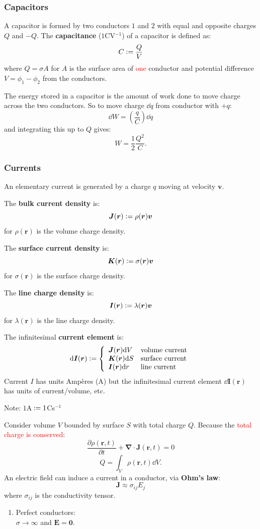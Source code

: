 \documentclass{article}
\newcommand{\deq}{\vcentcolon=}
\newcommand{\vc}[1]{\boldsymbol{#1}}
\begin{document}
\begin{multicols*}{3}
\subsubsection*{Capacitors}
A capacitor is formed by two conductors 
$1$ and $2$ with equal and opposite charges $Q$ and $-Q$.
The \textbf{capacitance} ($1$CV$^{-1}$) of a
capacitor is defined as:
$$C\deq\frac{Q}{V}$$
where $Q=\sigma A$ for $A$ is the surface area of 
\textcolor{red}{one} conductor and potential
difference $V=\phi_1-\phi_2$ from the conductors.

The energy stored in a capacitor is the amount
of work done to move charge across the two conductors.
So to move charge $\dd q$ from conductor with $+q$:
$$\dd W=\left(\frac{q}{C}\right)\dd q$$
and integrating this up to $Q$ gives:
$$W=\frac{1}{2}\frac{Q^2}{C}.$$

\subsubsection*{Currents}
An elementary current is generated
by a charge $q$ moving at velocity $\vc{v}$.

The \textbf{bulk current density} is:
$$\vc{J}(\vc{r})\deq\rho(\vc{r})\vc{v}$$
for $\rho(\vc{r})$ is the volume charge density.

The \textbf{surface current density} is:
$$\vc{K}(\vc{r})\deq\sigma(\vc{r})\vc{v}$$
for $\sigma(\vc{r})$ is the surface charge density.

The \textbf{line charge density} is:
$$\vc{I}(\vc{r})\deq\lambda(\vc{r})\vc{v}$$
for $\lambda(\vc{r})$ is the line charge density.

\newcolumn

The infinitesimal \textbf{current element} is:
$$\dd\vc{I}(\vc{r})\deq\left\{\begin{array}{lll}
    \vc{J}(\vc{r})\dd V & \text{volume current} \\
    \vc{K}(\vc{r})\dd S & \text{surface current} \\
    \vc{I}(\vc{r})\dd r & \text{line current}
\end{array}\right.$$
Current $I$ has units Amp\`eres (A)
but the infinitesimal current element $\dd\vc{I}(\vc{r})$
has units of current/volume, etc.

Note: $1$A$\hspace{0.03in}\deq1$Cs$^{-1}$

Consider volume $V$ bounded by surface $S$
with total charge $Q$.
Because the \textcolor{red}{total charge is conserved}:
$$\frac{\partial \rho(\vc{r},t)}{\partial t}
+\vc{\nabla}\cdot\vc{J}(\vc{r},t)=0$$
$$Q=\int_V\rho(\vc{r},t)\dd V.$$
An electric field can induce a current in a conductor,
via \textbf{Ohm's law}:
$$\vc{J}\approx\sigma_{ij}E_j$$
where $\sigma_{ij}$ is the conductivity tensor.
\begin{enumerate}
    \item Perfect conductors: \\
    $\sigma\rightarrow\infty$
    and $\vc{E}=\vc{0}$.


\end{enumerate}
\end{multicols*}
\end{document}
